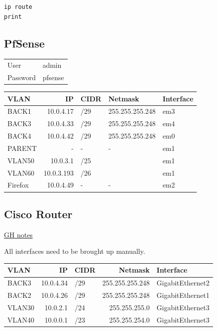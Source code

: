 \documentclass[11pt,parskip=half]{scrartcl}
\begin{document}
\begin{verbatim}
ip route
print
\end{verbatim}

\subsection{{\bfseries\sffamily } PfSense}
\label{sec:org08ed6ad}

\begin{center}
\begin{tabular}{ll}
User & admin\\
Password & pfsense\\
\end{tabular}
\end{center}

\begin{center}
\begin{tabular}{lrlll}
VLAN & IP & CIDR & Netmask & Interface\\
\hline
BACK1 & 10.0.4.17 & /29 & 255.255.255.248 & em3\\
BACK3 & 10.0.4.33 & /29 & 255.255.255.248 & em4\\
BACK4 & 10.0.4.42 & /29 & 255.255.255.248 & em0\\
PARENT & - & - & - & em1\\
VLAN50 & 10.0.3.1 & /25 &  & em1\\
VLAN60 & 10.0.3.193 & /26 &  & em1\\
Firefox & 10.0.4.49 & - & - & em2\\
\end{tabular}
\end{center}

\subsection{{\bfseries\sffamily } Cisco Router}
\label{sec:org4c9df29}

\href{https://github.com/jherrlin/dotfiles/blob/master/arch/helpme/.docs/cisco.org}{GH notes}

All interfaces need to be brought up manually.

\begin{center}
\begin{tabular}{lrlrl}
VLAN & IP & CIDR & Netmask & Interface\\
\hline
BACK3 & 10.0.4.34 & /29 & 255.255.255.248 & GigabitEthernet2\\
BACK2 & 10.0.4.26 & /29 & 255.255.255.248 & GigabitEthernet1\\
VLAN30 & 10.0.2.1 & /24 & 255.255.255.0 & GigabitEthernet3\\
VLAN40 & 10.0.0.1 & /23 & 255.255.254.0 & GigabitEthernet3\\
\end{tabular}
\end{center}
\end{document}
